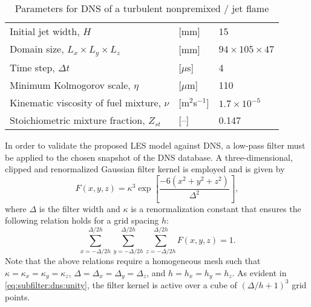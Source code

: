 \begin{table}[htbp]
\centering
\caption[Parameters for DNS of Turbulent Nonpremixed / Jet Flame]{Parameters for DNS of a turbulent nonpremixed / jet flame}
\label{tab:subfilter:dns:params}
\begin{tabular}{p{} p{} p{}}
\toprule
Initial jet width, $H$
& [mm] & 15 \\[0.2em]

Domain size, $L_x \times L_y \times L_z$
& [mm] & $94 \times 105 \times 47$ \\[0.2em]

Time step, $\Delta t$
& [$\mu$s] & 4 \\[0.2em]

Minimum Kolmogorov scale, $\eta$
& [$\mu$m] & 110 \\[0.2em]

Kinematic viscosity of fuel mixture, $\nu$
& [m$^2$s$^{-1}$] & $1.7 \times 10^{-5}$ \\[0.2em]

Stoichiometric mixture fraction, $Z_{st}$
& [--] & 0.147 \\

\bottomrule
\end{tabular}
\end{table}

In order to validate the proposed LES model against DNS, a low-pass filter must be applied to the chosen snapshot of the DNS database. A three-dimensional, clipped and renormalized Gaussian filter kernel is employed and is given by
\begin{equation}\label{eq:subfilter:dns:kernel}
  F(x,y,z) = \kappa^3\exp\left[ \frac{-6(x^2 + y^2 + z^2)}{\Delta^2} \right],
\end{equation}
where $\Delta$ is the filter width and $\kappa$ is a renormalization constant that ensures the following relation holds for a grid spacing $h$:
\begin{equation}\label{eq:subfilter:dns:unity}
  \sum\limits_{x = -\Delta/2h}^{\Delta/2h} \sum\limits_{y = -\Delta/2h}^{\Delta/2h} \sum\limits_{z = -\Delta/2h}^{\Delta/2h} F(x,y,z) = 1.
\end{equation}
Note that the above relations require a homogeneous mesh such that $\kappa = \kappa_x = \kappa_y = \kappa_z$, $\Delta = \Delta_x = \Delta_y = \Delta_z$, and $h = h_x = h_y = h_z$. As evident in \cref{eq:subfilter:dns:unity}, the filter kernel is active over a cube of $(\Delta/h + 1)^3$ grid points.


